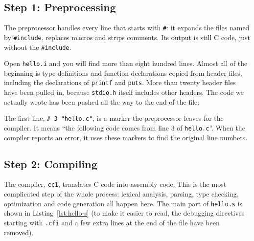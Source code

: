 \subsection{Step 1: Preprocessing}

The preprocessor handles every line that starts with \texttt{\#}: it expands the files named by \texttt{\#include}, replaces macros and strips comments. Its output is still C code, just without the \texttt{\#include}.

Open \texttt{hello.i} and you will find more than eight hundred lines. Almost all of the beginning is type definitions and function declarations copied from header files, including the declarations of \texttt{printf} and \texttt{puts}. More than twenty header files have been pulled in, because \texttt{stdio.h} itself includes other headers. The code we actually wrote has been pushed all the way to the end of the file:

The first line, \texttt{\# 3 "hello.c"}, is a marker the preprocessor leaves for the compiler. It means ``the following code comes from line 3 of \texttt{hello.c}''. When the compiler reports an error, it uses these markers to find the original line numbers.

\subsection{Step 2: Compiling}

The compiler, \texttt{cc1}, translates C code into assembly code. This is the most complicated step of the whole process: lexical analysis, parsing, type checking, optimization and code generation all happen here. The main part of \texttt{hello.s} is shown in Listing~\ref{lst:hello-s} (to make it easier to read, the debugging directives starting with \texttt{.cfi} and a few extra lines at the end of the file have been removed).


